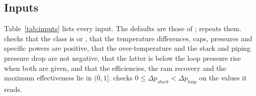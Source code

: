 \documentclass[a4paper,11pt]{article}
\begin{document}
\subsection{Inputs}
Table~\ref{tab:inputs} lists every input. The defaults are those of
;  repeats them.  checks that the
class is  or , that the temperature differences, caps, pressures and
specific powers are positive, that the over-temperature and the stack and piping pressure drop
are not negative, that the latter is below the loop pressure rise when both are given, and
that the efficiencies, the ram recovery and the maximum effectiveness lie in $(0, 1]$.
 checks $0 \le \Delta p_{stack} < \Delta p_{loop}$ on the values it reads.
\end{document}
